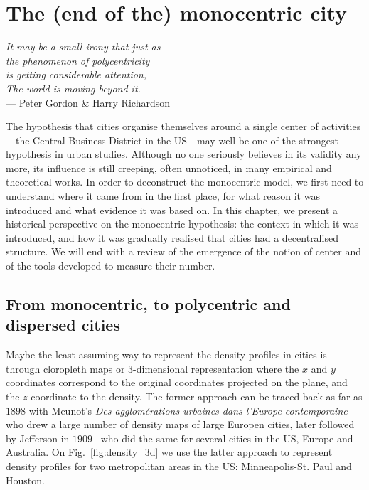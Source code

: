 %
\chapter{The (end of the) monocentric city}
\label{chap:monocentric_introduction}

\begin{flushright}{\slshape    
It may be a small irony that  
just as\\
the phenomenon of polycentricity\\ is getting considerable attention,\\
The world is moving beyond it.} \\ \medskip
--- Peter Gordon \& Harry Richardson~\cite{Gordon:1996}
\end{flushright}

The hypothesis that cities organise themselves around a single center of
activities---the Central Business District in the US---may well be one of the
strongest hypothesis in urban studies. Although no one seriously believes in its
validity any more, its influence is still creeping, often unnoticed, in many
empirical and theoretical works.  In order to deconstruct the monocentric model,
we first need to understand where it came from in the first place, for what
reason it was introduced and what evidence it was based on. In this chapter, we
present a historical perspective on the monocentric hypothesis: the context in
which it was introduced, and how it was gradually realised that cities had a
decentralised structure. We will end with a review of the emergence of the
notion of center and of the tools developed to measure their number.

\section{From monocentric, to polycentric and dispersed cities}
\label{sec:introduction}

Maybe the least assuming way to represent the density profiles in cities is
through cloropleth maps or 3-dimensional representation where the $x$ and $y$
coordinates correspond to the original coordinates projected on the plane, and
the $z$ coordinate to the density. The former approach can be traced back as far
as $1898$ with Meunot's \emph{Des agglom\'erations urbaines dans l'Europe
contemporaine}~\cite{Meunot:1898} who drew a large number of density maps of
large Europen cities, later followed by Jefferson in
$1909$~\cite{Jefferson:1909} who did the same for several cities in the US,
Europe and Australia. On Fig.~\ref{fig:density_3d} we use the latter approach to
represent density profiles for two metropolitan areas in the US: Minneapolis-St.
Paul and Houston. \\


